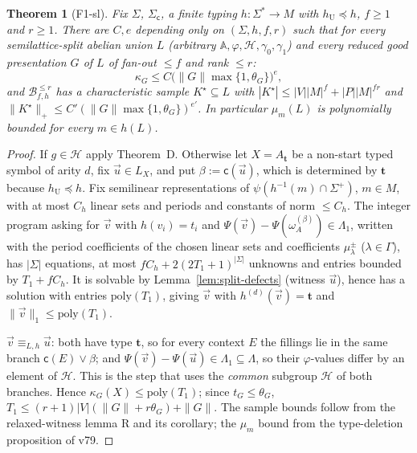 \documentclass[11pt]{article}
\newtheorem{theorem}{Theorem}
\theoremstyle{definition}
\theoremstyle{remark}
\newcommand{\tuple}[1]{\vec{#1}}
\newcommand{\B}{\mathcal B}
\newcommand{\mk}{\mathsf c}
\begin{document}
\begin{theorem}[F1-sl]\label{thm:split}
Fix $\Sigma$, $\Sigma_{\mk}$, a finite typing $h:\Sigma^*\to M$ with
$h_{\mathrm U}\preceq h$, $f\ge1$ and $r\ge1$.  There are $C,e$ depending
only on $(\Sigma,h,f,r)$ such that for every semilattice-split abelian union
$L$ (arbitrary $\mathbb A,\varphi,\mathcal H,\gamma_0,\gamma_1$) and every
reduced good presentation $G$ of $L$ of fan-out $\le f$ and rank $\le r$:
\[
\kappa_G\le C\bigl(\|G\|\max\{1,\theta_G\}\bigr)^e,
\]
and $\B^{\le r}_{f,h}$ has a characteristic sample $K^\star\subseteq L$ with
$|K^\star|\le|V||M|^f+|P||M|^{fr}$ and
$\|K^\star\|_+\le C'(\|G\|\max\{1,\theta_G\})^{e'}$.  In particular
$\mu_m(L)$ is polynomially bounded for every $m\in h(L)$.
\end{theorem}
\begin{proof}
If $g\in\mathcal H$ apply Theorem~D.  Otherwise let $X=A_{\mathbf t}$ be a
non-start typed symbol of arity $d$, fix $\tuple u\in L_X$, and put
$\beta:=\mk(\tuple u)$, which is determined by $\mathbf t$ because
$h_{\mathrm U}\preceq h$.  Fix semilinear representations of
$\psi(h^{-1}(m)\cap\Sigma^+)$, $m\in M$, with at most $C_h$ linear sets and
periods and constants of norm $\le C_h$.  The integer program asking for
$\tuple v$ with $h(v_i)=t_i$ and
$\Psi(\tuple v)-\Psi(\omega^{(\beta)}_A)\in\Lambda_1$, written with the
period coefficients of the chosen linear sets and coefficients
$\mu^\pm_\lambda$ ($\lambda\in\Gamma$), has $|\Sigma|$ equations, at most
$fC_h+2(2T_1+1)^{|\Sigma|}$ unknowns and entries bounded by $T_1+fC_h$.  It
is solvable by Lemma~\ref{lem:split-defects} (witness $\tuple u$), hence has
a solution with entries $\mathrm{poly}(T_1)$, giving $\tuple v$ with
$h^{(d)}(\tuple v)=\mathbf t$ and $\|\tuple v\|_1\le\mathrm{poly}(T_1)$.

$\tuple v\equiv_{L,h}\tuple u$: both have type $\mathbf t$, so for every
context $E$ the fillings lie in the same branch $\mk(E)\vee\beta$; and
$\Psi(\tuple v)-\Psi(\tuple u)\in\Lambda_1\subseteq\Lambda$, so their
$\varphi$-values differ by an element of $\mathcal H$.  This is the step
that uses the \emph{common} subgroup $\mathcal H$ of both branches.  Hence
$\kappa_G(X)\le\mathrm{poly}(T_1)$; since $t_G\le\theta_G$,
$T_1\le(r+1)|V|(\|G\|+r\theta_G)+\|G\|$.  The sample bounds follow from the
relaxed-witness lemma R and its corollary; the $\mu_m$ bound from the
type-deletion proposition of v79.
\end{proof}
\end{document}

